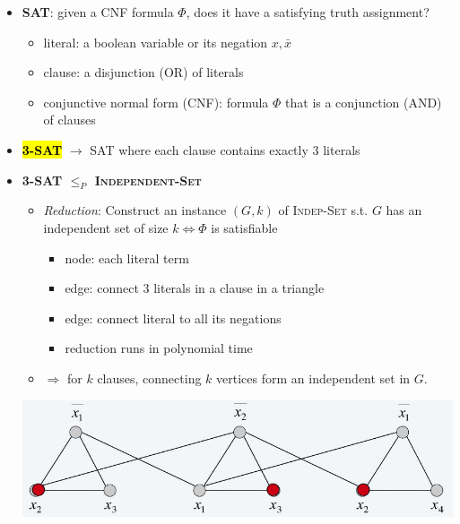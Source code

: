 \documentclass[10pt,landscape]{article}
\newcommand{\1}{\mathmybb{1}}
\newcommand{\definition}[2][]{\sethlcolor{paleyellow}\hl{\textbf{#2}} #1  $\rightarrow$}
\begin{document}
\begin{multicols*}{3}
  \begin{itemize}
    \item \textbf{SAT}: given a CNF formula $\Phi$, does it have a satisfying truth assignment?
      \begin{itemize}[topsep=0pt,noitemsep,wide=0pt, leftmargin=\dimexpr{} + 2\relax]
        \item literal: a boolean variable or its negation $x, \bar{x}$
        \item clause: a disjunction (OR) of literals
        \item conjunctive normal form (CNF): formula $\Phi$ that is a conjunction (AND) of clauses
      \end{itemize}
    \item \definition{3-SAT} SAT where each clause contains exactly $3$ literals
    \item \textbf{3-SAT $\leq_P$ \textsc{Independent-Set}}
      \begin{itemize}[topsep=0pt,noitemsep,wide=0pt, leftmargin=\dimexpr{} + 2\relax]
        \item \textit{Reduction}: Construct an instance $(G, k)$ of \textsc{Indep-Set} s.t. $G$ has an independent set of size $k \iff \Phi$ is satisfiable
          \begin{itemize}[topsep=0pt,noitemsep,wide=0pt, leftmargin=\dimexpr{} + 2\relax]
            \item node: each literal term
            \item edge: connect 3 literals in a clause in a triangle
            \item edge: connect literal to all its negations
            \item reduction runs in polynomial time
          \end{itemize}
        \item $\Rightarrow$ for $k$ clauses, connecting $k$ vertices form an independent set in $G$. 
      \end{itemize}
      \includegraphics[width=0.95\linewidth]{images/3sat.png} 
  \end{itemize}


\end{multicols*}
\end{document}
